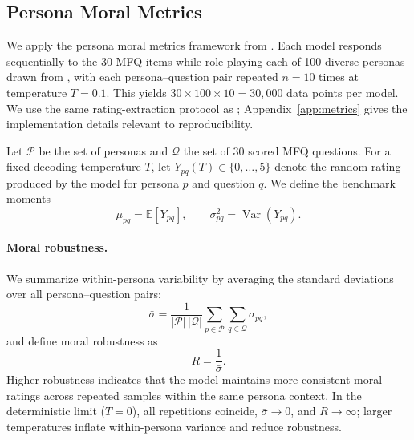\documentclass{article}
\begin{document}
\subsection{Persona Moral Metrics}
\label{sec:metrics}

We apply the persona moral metrics framework from \citep{costa2025moral}. Each model responds sequentially to the 30 MFQ items while role-playing each of 100 diverse personas drawn from \citep{ge2025scalingsyntheticdatacreation}, with each persona--question pair repeated $n = 10$ times at temperature $T = 0.1$. This yields $30 \times 100 \times 10 = 30{,}000$ data points per model. We use the same rating-extraction protocol as \cite{costa2025moral}; Appendix~\ref{app:metrics} gives the implementation details relevant to reproducibility.


Let $\mathcal{P}$ be the set of personas and $\mathcal{Q}$ the set of 30 scored MFQ questions. For a fixed decoding temperature $T$, let $Y_{pq}(T) \in \{0,\ldots,5\}$ denote the random rating produced by the model for persona $p$ and question $q$. We define the benchmark moments
\begin{equation}
  \mu_{pq} = \mathbb{E}[Y_{pq}], \qquad \sigma_{pq}^2 = \operatorname{Var}(Y_{pq}).
  \label{eq:persona-question-mean}
\end{equation}

\paragraph{Moral robustness.} We summarize within-persona variability by averaging the standard deviations over all persona--question pairs:
\begin{equation}
  \bar{\sigma} = \frac{1}{|\mathcal{P}|\,|\mathcal{Q}|} \sum_{p \in \mathcal{P}} \sum_{q \in \mathcal{Q}} \sigma_{pq},
  \label{eq:mean-sigma}
\end{equation}
and define moral robustness as
\begin{equation}
  R = \frac{1}{\bar{\sigma}}.
  \label{eq:robustness}
\end{equation}
Higher robustness indicates that the model maintains more consistent moral ratings across repeated samples within the same persona context. In the deterministic limit ($T=0$), all repetitions coincide, $\bar{\sigma} \to 0$, and $R \to \infty$; larger temperatures inflate within-persona variance and reduce robustness.
\end{document}
